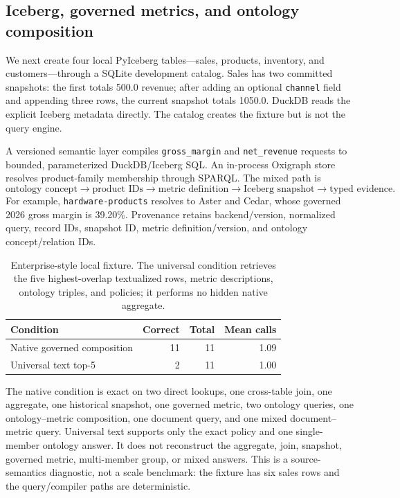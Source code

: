 \documentclass[11pt]{article}
\begin{document}
\subsection{Iceberg, governed metrics, and ontology composition}
We next create four local PyIceberg tables---sales, products, inventory, and
customers---through a SQLite development catalog. Sales has two committed
snapshots: the first totals 500.0 revenue; after adding an optional
\texttt{channel} field and appending three rows, the current snapshot totals
1050.0. DuckDB reads the explicit Iceberg metadata directly. The catalog creates
the fixture but is not the query engine.

A versioned semantic layer compiles \texttt{gross\_margin} and
\texttt{net\_revenue} requests to bounded, parameterized DuckDB/Iceberg SQL.
An in-process Oxigraph store resolves product-family membership through SPARQL.
The mixed path is
\[
\text{ontology concept}\rightarrow\text{product IDs}\rightarrow
\text{metric definition}\rightarrow\text{Iceberg snapshot}\rightarrow
\text{typed evidence}.
\]
For example, \texttt{hardware-products} resolves to Aster and Cedar, whose
governed 2026 gross margin is 39.20\%. Provenance retains backend/version,
normalized query, record IDs, snapshot ID, metric definition/version, and
ontology concept/relation IDs.

\begin{table}[t]
\centering\small
\caption{Enterprise-style local fixture. The universal condition retrieves the
five highest-overlap textualized rows, metric descriptions, ontology triples,
and policies; it performs no hidden native aggregate.}
\label{tab:p25-enterprise}
\begin{tabular}{lrrr}
\toprule
Condition & Correct & Total & Mean calls\\
\midrule
Native governed composition & 11 & 11 & 1.09\\
Universal text top-5 & 2 & 11 & 1.00\\
\bottomrule
\end{tabular}
\end{table}

The native condition is exact on two direct lookups, one cross-table join, one
aggregate, one historical snapshot, one governed metric, two ontology queries,
one ontology--metric composition, one document query, and one mixed
document--metric query. Universal text supports only the exact policy and one
single-member ontology answer. It does not reconstruct the aggregate, join,
snapshot, governed metric, multi-member group, or mixed answers. This is a
source-semantics diagnostic, not a scale benchmark: the fixture has six sales
rows and the query/compiler paths are deterministic.
\end{document}
